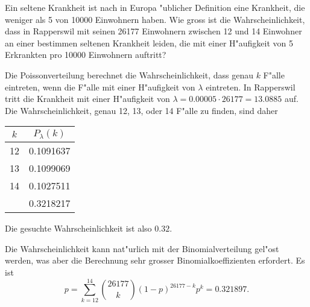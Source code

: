 Ein seltene Krankheit ist nach in Europa "ublicher Definition eine
Krankheit, die weniger als 5 von 10000 Einwohnern haben. Wie gross
ist die Wahrscheinlichkeit, dass in Rapperswil mit seinen 26177
Einwohnern zwischen 12 und 14 Einwohner an einer bestimmen
seltenen Krankheit leiden, die mit einer H"aufigkeit von 5 Erkrankten
pro 10000 Einwohnern auftritt?

\begin{loesung}
Die Poissonverteilung berechnet die Wahrscheinlichkeit, dass genau
$k$ F"alle eintreten, wenn die F"alle mit einer H"aufigkeit
von $\lambda$ eintreten. In Rapperswil tritt die Krankheit mit
einer H"aufigkeit von $\lambda=0.00005 \cdot 26177=13.0885$ auf.
Die Wahrscheinlichkeit, genau 12, 13, oder 14 F"alle zu finden, sind
daher
\begin{center}
\begin{tabular}{|c|c|}
\hline
$k$&$P_\lambda(k)$\\
\hline
12&0.1091637\\
13&0.1099069\\
14&0.1027511\\
\hline
  &0.3218217\\
\hline
\end{tabular}
\end{center}
Die gesuchte Wahrscheinlichkeit ist also $0.32$.

Die Wahrscheinlichkeit kann nat"urlich mit der Binomialverteilung
gel"ost werden, was aber die Berechnung sehr grosser Binomialkoeffizienten
erfordert. Es ist
\[
p=\sum_{k=12}^{14}\binom{26177}{k}(1-p)^{26177-k}p^k=0.321897.
\]
\end{loesung}

